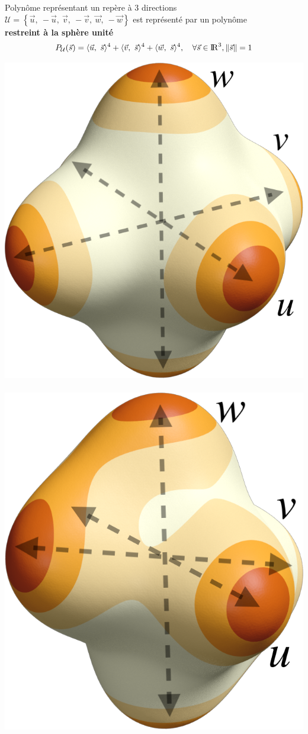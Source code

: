 \begin{frame}{Polynôme représentant un repère à 3 directions}
    \centering
    \small
    $\mathcal{U} = \left\{\vec{u},\ -\vec{u},\ \vec{v},\ -\vec{v},\ \vec{w},\ -\vec{w}\right\}$ est représenté par un polynôme \\
    \textbf{restreint à la sphère unité}
    $$ P_\mathcal{U}(\vec{s}) = \langle \vec{u},\ \vec{s}\rangle^{4} +  \langle \vec{v},\ \vec{s}\rangle^{4} +  \langle \vec{w},\ \vec{s}\rangle^{4}, \ \ \   \forall \vec{s} \in {\rm I\!R}^3, \lVert \vec{s} \rVert = 1$$
    
    \vspace*{.5\baselineskip}
    \includegraphics[width=0.33\linewidth]{img_spm_ff/sperical_3dir4.png}
    \ \ \ \ \ \ \ \ \ \ \ 
    \includegraphics[width=0.3\linewidth]{img_spm_ff/sperical_3dir4_rot.png}
\end{frame} 
